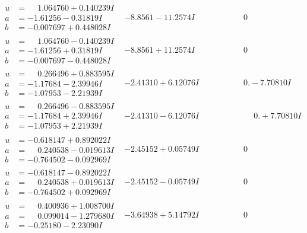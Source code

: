 \documentclass[1p]{elsarticle_modified}
\theoremstyle{definition}
\begin{document}
$$\begin{array}{c|c|c}
\begin{aligned}
u &= \phantom{-}1.064760 + 0.140239 I \\
a &= -1.61256 - 0.31819 I \\
b &= -0.007697 + 0.448028 I\end{aligned}
 & -8.8561 - 11.2574 I & \phantom{-0.000000 } 0 \\ \hline\begin{aligned}
u &= \phantom{-}1.064760 - 0.140239 I \\
a &= -1.61256 + 0.31819 I \\
b &= -0.007697 - 0.448028 I\end{aligned}
 & -8.8561 + 11.2574 I & \phantom{-0.000000 } 0 \\ \hline\begin{aligned}
u &= \phantom{-}0.266496 + 0.883595 I \\
a &= -1.17684 - 2.39946 I \\
b &= -1.07953 - 2.21939 I\end{aligned}
 & -2.41310 + 6.12076 I & \phantom{-0.000000 } 0. - 7.70810 I \\ \hline\begin{aligned}
u &= \phantom{-}0.266496 - 0.883595 I \\
a &= -1.17684 + 2.39946 I \\
b &= -1.07953 + 2.21939 I\end{aligned}
 & -2.41310 - 6.12076 I & \phantom{-0.000000 -}0. + 7.70810 I \\ \hline\begin{aligned}
u &= -0.618147 + 0.892022 I \\
a &= \phantom{-}0.240538 - 0.019613 I \\
b &= -0.764502 - 0.092969 I\end{aligned}
 & -2.45152 + 0.05749 I & \phantom{-0.000000 } 0 \\ \hline\begin{aligned}
u &= -0.618147 - 0.892022 I \\
a &= \phantom{-}0.240538 + 0.019613 I \\
b &= -0.764502 + 0.092969 I\end{aligned}
 & -2.45152 - 0.05749 I & \phantom{-0.000000 } 0 \\ \hline\begin{aligned}
u &= \phantom{-}0.400936 + 1.008700 I \\
a &= \phantom{-}0.099014 - 1.279680 I \\
b &= -0.25180 - 2.23090 I\end{aligned}
 & -3.64938 + 5.14792 I & \phantom{-0.000000 } 0 \\ \hline\begin{aligned}

\end{aligned}
\end{array}$$
\end{document}
